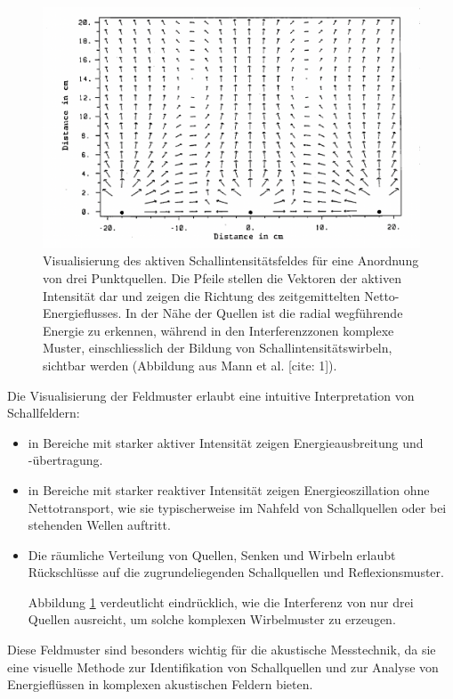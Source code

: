 \begin{figure}
\centering
\includegraphics[scale=0.4]{papers/helmholtz/images/aktiveSchallintensitaet.png}
\caption{Visualisierung des aktiven Schallintensitätsfeldes für eine Anordnung von drei Punktquellen. Die Pfeile stellen die Vektoren der aktiven Intensität dar und zeigen die Richtung des zeitgemittelten Netto-Energieflusses. In der Nähe der Quellen ist die radial wegführende Energie zu erkennen, während in den Interferenzzonen komplexe Muster, einschliesslich der Bildung von Schallintensitätswirbeln, sichtbar werden (Abbildung aus Mann et al. [cite: 1]).}
\label{fig:aktive_intensitaet_3quellen}
\end{figure}
 
Die Visualisierung der Feldmuster erlaubt eine intuitive Interpretation von Schallfeldern:
 
\begin{itemize}
\item in Bereiche mit starker aktiver Intensität zeigen Energieausbreitung und -übertragung.
\item in Bereiche mit starker reaktiver Intensität zeigen Energieoszillation ohne Nettotransport, wie sie typischerweise im Nahfeld von Schallquellen oder bei stehenden Wellen auftritt.
\item Die räumliche Verteilung von Quellen, Senken und Wirbeln erlaubt Rückschlüsse auf die zugrundeliegenden Schallquellen und Reflexionsmuster. 

Abbildung \ref{fig:aktive_intensitaet_3quellen} verdeutlicht eindrücklich, wie die Interferenz von nur drei Quellen ausreicht, um solche komplexen Wirbelmuster zu erzeugen.
\end{itemize}
 
\noindent Diese Feldmuster sind besonders wichtig für die akustische Messtechnik, da sie eine visuelle Methode zur Identifikation von Schallquellen und zur Analyse von Energieflüssen in komplexen akustischen Feldern bieten.




